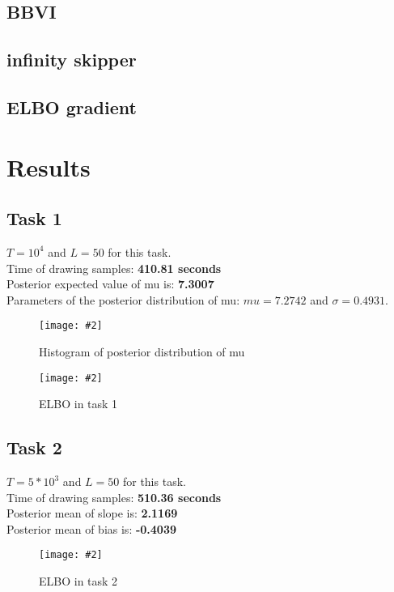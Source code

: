 \documentclass{article}
\newcommand{\centerfigcap}[3]{\begin{figure}[H]
\begin{center}\texttt{[image: \#2]} \caption{#3}\end{center}
\end{figure}}
\begin{document}
\subsection{BBVI}

\subsection{infinity skipper}

\pagebreak
\subsection{ELBO gradient}



\section{Results}
\subsection{Task 1}
$T = 10^4$ and $L = 50$ for this task.\\
Time of drawing samples: \textbf{410.81 seconds}\\
Posterior expected value of mu is: \textbf{7.3007}\\
Parameters of the posterior distribution of mu: $mu = 7.2742$ and $\sigma = 0.4931$.\\

\centerfigcap{0.6}{../figures/BBVI_plt_hist_program_1_d_0}{Histogram of posterior distribution of mu}
\centerfigcap{1}{../figures/ELBO_1}{ELBO in task 1}

\subsection{Task 2}
$T = 5*10^3$ and $L = 50$ for this task.\\
Time of drawing samples: \textbf{510.36 seconds}\\
Posterior mean of slope is: \textbf{2.1169}\\
Posterior mean of bias is: \textbf{-0.4039}\\
\centerfigcap{1}{../figures/ELBO_2}{ELBO in task 2}
\end{document}
